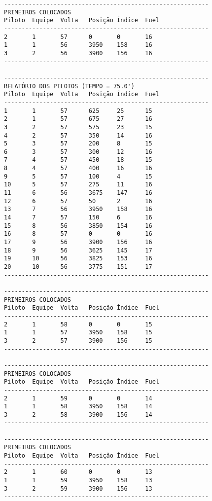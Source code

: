 \documentclass[12pt]{article}
\begin{document}
\begin{verbatim}
----------------------------------------------------------
PRIMEIROS COLOCADOS
Piloto  Equipe  Volta   Posição Índice  Fuel
----------------------------------------------------------
2       1       57      0       0       16
1       1       56      3950    158     16
3       2       56      3900    156     16
----------------------------------------------------------

----------------------------------------------------------
RELATÓRIO DOS PILOTOS (TEMPO = 75.0')
Piloto  Equipe  Volta   Posição Índice  Fuel
----------------------------------------------------------
1       1       57      625     25      15
2       1       57      675     27      16
3       2       57      575     23      15
4       2       57      350     14      16
5       3       57      200     8       15
6       3       57      300     12      16
7       4       57      450     18      15
8       4       57      400     16      16
9       5       57      100     4       15
10      5       57      275     11      16
11      6       56      3675    147     16
12      6       57      50      2       16
13      7       56      3950    158     16
14      7       57      150     6       16
15      8       56      3850    154     16
16      8       57      0       0       16
17      9       56      3900    156     16
18      9       56      3625    145     17
19      10      56      3825    153     16
20      10      56      3775    151     17
----------------------------------------------------------

----------------------------------------------------------
PRIMEIROS COLOCADOS
Piloto  Equipe  Volta   Posição Índice  Fuel
----------------------------------------------------------
2       1       58      0       0       15
1       1       57      3950    158     15
3       2       57      3900    156     15
----------------------------------------------------------

----------------------------------------------------------
PRIMEIROS COLOCADOS
Piloto  Equipe  Volta   Posição Índice  Fuel
----------------------------------------------------------
2       1       59      0       0       14
1       1       58      3950    158     14
3       2       58      3900    156     14
----------------------------------------------------------

----------------------------------------------------------
PRIMEIROS COLOCADOS
Piloto  Equipe  Volta   Posição Índice  Fuel
----------------------------------------------------------
2       1       60      0       0       13
1       1       59      3950    158     13
3       2       59      3900    156     13
----------------------------------------------------------


\end{verbatim}
\end{document}
